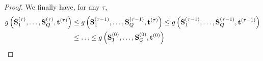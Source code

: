 \begin{proof}
We finally have, for any $\tau$,
\begin{align*}
g\left ({\mathbf{S}}_1^{(\tau)}, \ldots,{\mathbf{S}}_Q^{(\tau)}, {\mathbf{t}}^{(\tau)}\right ) 
& \leq
g\left ({\mathbf{S}}_1^{(\tau-1)}, \ldots,{\mathbf{S}}_Q^{(\tau-1)}, {\mathbf{t}}^{(\tau)}\right )
\leq 
g\left ({\mathbf{S}}_1^{(\tau-1)}, \ldots,{\mathbf{S}}_Q^{(\tau-1)}, {\mathbf{t}}^{(\tau-1)}\right ) \\
& \leq \ldots \leq
g\left ({\mathbf{S}}_1^{(0)}, \ldots,{\mathbf{S}}_Q^{(0)}, {\mathbf{t}}^{(0)}\right )
\end{align*}
\end{proof}

